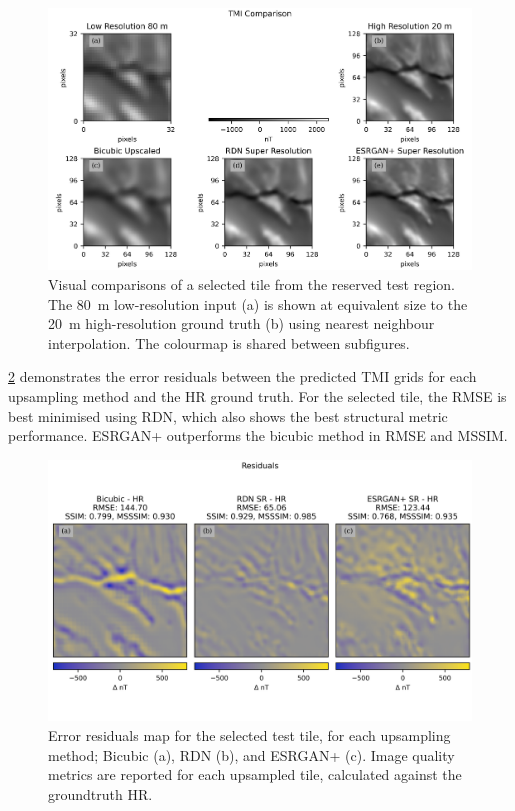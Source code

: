 \documentclass[manuscript.tex]{subfiles}
\begin{document}
\begin{figure}[hbt]
    \includegraphics[width=\linewidth]{fig/p1/image6.png}
    \caption[Visual inference results]{Visual comparisons of a selected tile from the reserved test region.
        The \SI{80}{\metre} low-resolution input (a) is shown at equivalent size to the \SI{20}{\metre} high-resolution ground truth (b) using nearest neighbour interpolation.
        The colourmap is shared between subfigures.
    }
    \label{fig:resultsvis}
\end{figure}

\cref{fig:residuals} demonstrates the error residuals between the predicted TMI grids for each upsampling method and the HR ground truth.
For the selected tile, the RMSE is best minimised using RDN\textdaggerdbl{}, which also shows the best structural metric performance.
ESRGAN+ outperforms the bicubic method in RMSE and MSSIM\@.

\begin{figure}[hbt]
    \includegraphics[width=\linewidth]{fig/p1/image7.png}
    \caption[Error residuals map for a selected tile]{Error residuals map for the selected test tile, for each upsampling method; Bicubic (a), RDN\textdaggerdbl{} (b), and ESRGAN+ (c).
        Image quality metrics are reported for each upsampled tile, calculated against the groundtruth HR\@.}
    \label{fig:residuals}
\end{figure}
\end{document}
